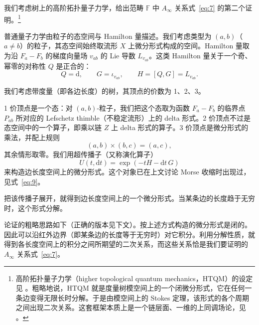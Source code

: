 我们考虑树上的高阶拓扑量子力学，给出范畴 $\mathbb{F}$ 中 $A_\infty$ 关系式~\eqref{eq:7} 的第二个证明。\footnote{高阶拓扑量子力学（higher topological quantum mechanics，HTQM）的设定见 \cite{losev,losevpolyubin}。粗略地说，HTQM 就是度量树模空间上的一个闭微分形式，它在任何一条边变得无限长时分解。于是由模空间上的 Stokes 定理，该形式的各个周期之间出现二次关系。这套框架本质上是一个链层面、一维的上同调场论，见 \cite{kontsevichmanin}。}

普通量子力学由粒子的态空间与 Hamilton 量描述。我们考虑类型为 $(a,b)$（$a\neq b$）的粒子，其态空间始终取流形 $X$ 上微分形式构成的空间。Hamilton 量取为沿 $F_a-F_b$ 的梯度向量场 $v_{ab}$ 的 Lie 导数 $L_{v_{ab}}$。这类 Hamilton 量关于一个奇、幂零的对称性 $Q$ 是正合的：
\[
  Q=\mathrm{d},\qquad G=\iota_{v_{ab}},\qquad H=[Q,G]=L_{v_{ab}}.
\]

我们考虑带度量（即各边长度）的树，其顶点的价数为 1、2、3。

1 价顶点是一个态：对 $(a,b)$-粒子，我们把这个态取为函数 $F_a-F_b$ 的临界点 $P_{ab}$ 所对应的 Lefschetz thimble（不稳定流形）上的 delta 形式。2 价顶点不过是态空间中的一个算子，即乘以链 $Z$ 上 delta 形式的算子。3 价顶点是微分形式的乘法，并配上规则
\[
  (a,b)\times(b,c)=(a,c),
\]
其余情形取零。我们用超传播子（又称演化算子）
\begin{equation}\tag{48}\label{eq:48}
  U(t,\mathrm{d}t)=\exp(-tH-\mathrm{d}t\,G)
\end{equation}
来构造边长度空间上的微分形式。这个对象已在上文讨论 Morse 收缩时出现过，见式~\eqref{eq:9}。


把该传播子展开，就得到边长度空间上的一个微分形式。当某条边的长度趋于无穷时，这个形式分解。

论证的粗略思路如下（正确的版本见下文）。按上述方式构造的微分形式是闭的。因此可以沿红外边界（即某条边的长度等于无穷时）对它积分。利用分解性质，就得到各长度空间上的积分之间所期望的二次关系，而这些关系恰是我们要证明的 $A_\infty$ 关系式~\eqref{eq:7}。


